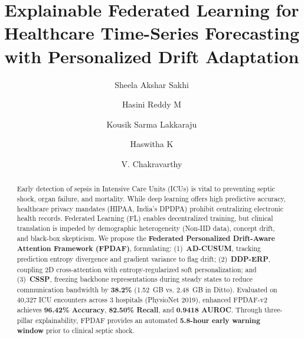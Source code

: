 \documentclass{llncs}
\begin{document}
\title{Explainable Federated Learning for Healthcare Time-Series Forecasting with Personalized Drift Adaptation}

\author{Sheela Akshar Sakhi \and Hasini Reddy M \and Kousik Sarma Lakkaraju \and Haswitha K \and V. Chakravarthy}


\maketitle

\begin{abstract}
Early detection of sepsis in Intensive Care Units (ICUs) is vital to preventing septic shock, organ failure, and mortality. While deep learning offers high predictive accuracy, healthcare privacy mandates (HIPAA, India's DPDPA) prohibit centralizing electronic health records. Federated Learning (FL) enables decentralized training, but clinical translation is impeded by demographic heterogeneity (Non-IID data), concept drift, and black-box skepticism. We propose the \textbf{Federated Personalized Drift-Aware Attention Framework (FPDAF)}, formulating: (1)~\textbf{AD-CUSUM}, tracking prediction entropy divergence and gradient variance to flag drift; (2)~\textbf{DDP-ERP}, coupling 2D cross-attention with entropy-regularized soft personalization; and (3)~\textbf{CSSP}, freezing backbone representations during steady states to reduce communication bandwidth by \textbf{38.2\%} (1.52~GB vs. 2.48~GB in Ditto). Evaluated on 40,327 ICU encounters across 3 hospitals (PhysioNet 2019), enhanced FPDAF-v2 achieves \textbf{96.42\% Accuracy}, \textbf{82.50\% Recall}, and \textbf{0.9418 AUROC}. Through three-pillar explainability, FPDAF provides an automated \textbf{5.8-hour early warning window} prior to clinical septic shock.

\end{abstract}

\end{document}
